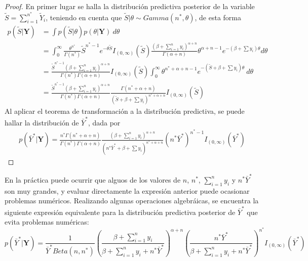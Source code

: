     \begin{proof}
    En primer lugar se halla la distribuci\'on predictiva posterior de la variable $\tilde{S}=\sum_{i=1}^{n^*}\tilde{Y}_i$, teniendo en cuenta que $\tilde{S}|\theta\sim Gamma(n^*,\theta)$, de esta forma
    \begin{align*}
    p(\tilde{S}|\mathbf{Y})&=\int p(\tilde{S}|\theta)p(\theta|\mathbf{Y})\ d\theta\\
    &=\int_0^{\infty} \frac{\theta^{n^*}}{\Gamma(n^*)}\tilde{S}^{n^*-1}e^{-\theta\tilde{S}}I_{(0,\infty)}(\tilde{S})\frac{(\beta+\sum_{i=1}^ny_i)^{\alpha+n}}{\Gamma(\alpha+n)}\theta^{{\alpha+n-1}}e^{-(\beta+\sum y_i)\theta}d\theta\\
    &=\frac{\tilde{S}^{n^*-1}(\beta+\sum_{i=1}^ny_i)^{\alpha+n}}{\Gamma(n^*)\Gamma(\alpha+n)}I_{(0,\infty)}(\tilde{S})\int_0^{\infty} \theta^{n^*+\alpha+n-1}e^{-(\tilde{S}+\beta+\sum y_i)\theta}\ d\theta\\
    &=\frac{\tilde{S}^{n^*-1}(\beta+\sum_{i=1}^ny_i)^{\alpha+n}}{\Gamma(n^*)\Gamma(\alpha+n)}\frac{\Gamma(n^*+\alpha+n)}{(\tilde{S}+\beta+\sum y_i)^{n^*+\alpha+n}}I_{(0,\infty)}(\tilde{S})
    \end{align*}
    Al aplicar el teorema de transformaci\'on a la distribuci\'on predictiva, se puede hallar la distribuci\'on de $\bar{Y}^*$, dada por
    \begin{align*}
    p(\bar{Y}^*|\mathbf{Y})=\frac{n^*\Gamma(n^*+\alpha+n)}{\Gamma(n^*)\Gamma(\alpha+n)}\frac{(\beta+\sum_{i=1}^ny_i)^{\alpha+n}}{(n^*\bar{Y}^*+\beta+\sum y_i)^{n^*+\alpha+n}}(n^*\bar{Y}^*)^{n^*-1}I_{(0,\infty)}(\bar{Y}^*)
    \end{align*}
    \end{proof}
    
    En la pr\'actica puede ocurrir que alguos de los valores de $n$, $n^*$, $\sum_{i=1}^ny_i$ y $n^*\bar{Y}^*$ son muy grandes, y evaluar directamente la expresi\'on anterior puede ocasionar problemas num\'ericos. Realizando algunas operaciones algebr\'aicas, se encuentra la siguiente expresi\'on equivalente para la distribuci\'on predictiva posterior de $\bar{Y}^*$ que evita problemas num\'ericas:
    \begin{equation}\label{pred_expo_Informa2}
    p(\bar{Y}^*|\mathbf{Y})=\frac{1}{\bar{Y}^*Beta(n,n^*)}\left(\frac{\beta+\sum_{i=1}^ny_i}{\beta+\sum_{i=1}^ny_i+n^*\bar{Y}^*}\right)^{\alpha+n}\left(\frac{n^*\bar{Y}^*}{\beta+\sum_{i=1}^ny_i+n^*\bar{Y}^*}\right)^{n^*}I_{(0,\infty)}(\bar{Y}^*)
    \end{equation}
    
